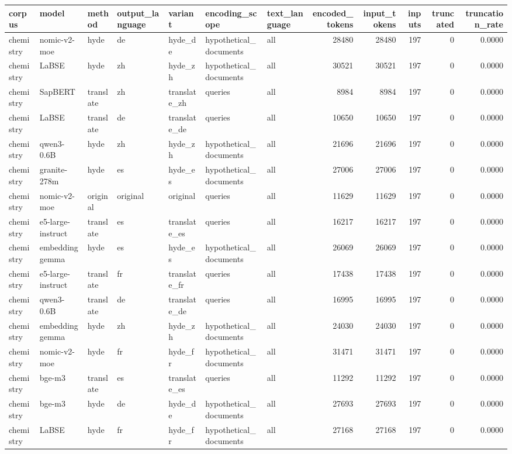 \begin{tabular}{lllllllrrrrr}
\toprule
corpus & model & method & output\_language & variant & encoding\_scope & text\_language & encoded\_tokens & input\_tokens & inputs & truncated & truncation\_rate \\
\midrule
chemistry & nomic-v2-moe & hyde & de & hyde\_de & hypothetical\_documents & all & 28480 & 28480 & 197 & 0 & 0.0000 \\
chemistry & LaBSE & hyde & zh & hyde\_zh & hypothetical\_documents & all & 30521 & 30521 & 197 & 0 & 0.0000 \\
chemistry & SapBERT & translate & zh & translate\_zh & queries & all & 8984 & 8984 & 197 & 0 & 0.0000 \\
chemistry & LaBSE & translate & de & translate\_de & queries & all & 10650 & 10650 & 197 & 0 & 0.0000 \\
chemistry & qwen3-0.6B & hyde & zh & hyde\_zh & hypothetical\_documents & all & 21696 & 21696 & 197 & 0 & 0.0000 \\
chemistry & granite-278m & hyde & es & hyde\_es & hypothetical\_documents & all & 27006 & 27006 & 197 & 0 & 0.0000 \\
chemistry & nomic-v2-moe & original & original & original & queries & all & 11629 & 11629 & 197 & 0 & 0.0000 \\
chemistry & e5-large-instruct & translate & es & translate\_es & queries & all & 16217 & 16217 & 197 & 0 & 0.0000 \\
chemistry & embeddinggemma & hyde & es & hyde\_es & hypothetical\_documents & all & 26069 & 26069 & 197 & 0 & 0.0000 \\
chemistry & e5-large-instruct & translate & fr & translate\_fr & queries & all & 17438 & 17438 & 197 & 0 & 0.0000 \\
chemistry & qwen3-0.6B & translate & de & translate\_de & queries & all & 16995 & 16995 & 197 & 0 & 0.0000 \\
chemistry & embeddinggemma & hyde & zh & hyde\_zh & hypothetical\_documents & all & 24030 & 24030 & 197 & 0 & 0.0000 \\
chemistry & nomic-v2-moe & hyde & fr & hyde\_fr & hypothetical\_documents & all & 31471 & 31471 & 197 & 0 & 0.0000 \\
chemistry & bge-m3 & translate & es & translate\_es & queries & all & 11292 & 11292 & 197 & 0 & 0.0000 \\
chemistry & bge-m3 & hyde & de & hyde\_de & hypothetical\_documents & all & 27693 & 27693 & 197 & 0 & 0.0000 \\
chemistry & LaBSE & hyde & fr & hyde\_fr & hypothetical\_documents & all & 27168 & 27168 & 197 & 0 & 0.0000 \\

\end{tabular}
